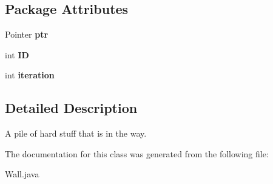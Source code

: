 \subsection*{Package Attributes}
\begin{DoxyCompactItemize}
\item 
\hypertarget{classWall_a0f655169d4d3736c36ed5faf73180fff}{
Pointer {\bfseries ptr}}
\label{classWall_a0f655169d4d3736c36ed5faf73180fff}

\item 
\hypertarget{classWall_a1ab0d77b6d252ac390297def1717e5ae}{
int {\bfseries ID}}
\label{classWall_a1ab0d77b6d252ac390297def1717e5ae}

\item 
\hypertarget{classWall_a9e378031c754e4e59d45b269f99f541e}{
int {\bfseries iteration}}
\label{classWall_a9e378031c754e4e59d45b269f99f541e}

\end{DoxyCompactItemize}


\subsection{Detailed Description}
A pile of hard stuff that is in the way. 

The documentation for this class was generated from the following file:\begin{DoxyCompactItemize}
\item 
Wall.java\end{DoxyCompactItemize}
